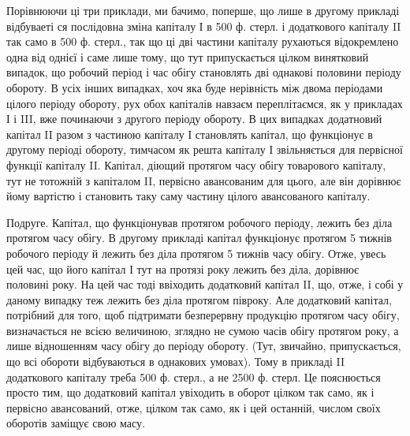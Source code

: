 Порівнюючи ці три приклади, ми бачимо, поперше, що лише в другому
прикладі відбуваеті ся послідовна зміна капіталу І в 500 ф. стерл.
і додаткового капіталу II так само в 500 ф. стерл., так що ці дві частини
капіталу рухаються відокремлено одна від однієї і саме лише тому, що
тут припускається цілком винятковий випадок, що робочий період і час
обігу становлять дві однакові половини періоду обороту. В усіх інших
випадках, хоч яка буде нерівність між двома періодами цілого періоду
обороту, рух обох капіталів навзаєм переплітаємся, як у прикладах
І і III, вже починаючи з другого періоду обороту. В цих випадках додатновий
капітал II разом з частиною капіталу І становлять капітал, що функціонує
в другому періоді обороту, тимчасом як решта капіталу І звільняється
для первісної функції капіталу II. Капітал, діющий протягом часу
обігу товарового капіталу, тут не тотожній з капіталом II, первісно авансованим
для цього, але він дорівнює йому вартістю і становить таку саму
частину цілого авансованого капіталу.

Подруге. Капітал, що функціонував протягом робочого періоду,
лежить без діла протягом часу обігу. В другому прикладі капітал функціонує
протягом 5 тижнів робочого періоду й лежить без діла протягом
5 тижнів часу обігу. Отже, увесь цей час, що його капітал І тут на протязі
року лежить без діла, дорівнює половині року. На цей час тоді ввіходить
додатковий капітал II, що, отже, і собі у даному випадку теж лежить без діла
протягом півроку. Але додатковий капітал, потрібний для того, щоб підтримати
безперервну продукцію протягом часу обігу, визначається не
всією величиною, зглядно не сумою часів обігу протягом року, а лише
відношенням часу обігу до періоду обороту. (Тут, звичайно, припускається,
що всі обороти відбуваються в однакових умовах). Тому в прикладі
II додаткового капіталу треба 500 ф. стерл., а не 2500 ф. стерл.
Це пояснюється просто тим, що додатковий капітал увіходить в оборот
цілком так само, як і первісно авансований, отже, цілком так само, як
і цей останній, числом своїх оборотів заміщує свою масу.

